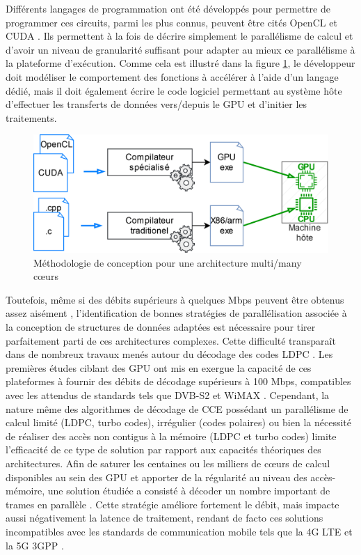 \documentclass[../main.tex]{subfiles}
\begin{document}
Différents langages de programmation ont été développés pour permettre de programmer ces circuits, parmi les plus connus, peuvent être cités OpenCL \cite{OpenCL} et CUDA \cite{CUDA}. Ils permettent à la fois de décrire simplement le parallélisme de calcul et d’avoir un niveau de granularité suffisant pour adapter au mieux ce parallélisme à la plateforme d’exécution. Comme cela est illustré dans la figure \ref{methodo_multimany}, le développeur doit modéliser le comportement des fonctions à accélérer à l’aide d’un langage dédié, mais il doit également écrire le code logiciel permettant au système hôte d’effectuer les transferts de données vers/depuis le GPU et d’initier les traitements.
\begin{figure}[tb]
    \centering
    \includegraphics[scale=.17]{figs/methodo_multimany.png}
    \caption{Méthodologie de conception pour une architecture multi/many cœurs}
    \label{methodo_multimany}
\end{figure}
Toutefois, même si des débits supérieurs à quelques Mbps peuvent être obtenus assez aisément \cite{Wang13,Wang11,Falcao11}, l’identification de bonnes stratégies de parallélisation associée à la conception de structures de données adaptées est nécessaire pour tirer parfaitement parti de ces architectures complexes. Cette difficulté transparaît dans de nombreux travaux menés autour du décodage des codes LDPC \cite{FALCAO:SURVEY,BLG:REVUE:TPDS}. Les premières études ciblant des GPU \cite{Falcao11} ont mis en exergue la capacité de ces plateformes à fournir des débits de décodage supérieurs à 100 Mbps, compatibles avec les attendus de standards tels que DVB-S2 \cite{DVB:S2} et WiMAX \cite{wimax}. 
Cependant, la nature même des algorithmes de décodage de CCE possédant un parallélisme de calcul limité (LDPC, turbo codes), irrégulier (codes polaires) ou bien la nécessité de réaliser des accès non contigus à la mémoire (LDPC et turbo codes) limite l’efficacité de ce type de solution par rapport aux capacités théoriques des architectures.
Afin de saturer les centaines ou les milliers de cœurs de calcul disponibles au sein des GPU et apporter de la régularité au niveau des accès-mémoire, une solution étudiée a consisté à décoder un nombre important de trames en parallèle \cite{BLG:GPU}. Cette stratégie améliore fortement le débit, mais impacte aussi négativement la latence de traitement, rendant de facto ces solutions incompatibles avec les standards de communication mobile tels que la 4G LTE \cite{Ref_4G} et la 5G 3GPP \cite{5g}.
\end{document}
